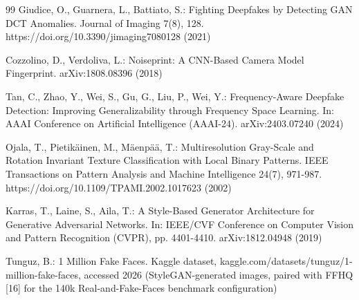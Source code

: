\documentclass[11pt]{article}
\begin{document}
\begin{thebibliography}{99}
 Giudice, O., Guarnera, L., Battiato, S.: Fighting Deepfakes by Detecting GAN DCT Anomalies. Journal of Imaging 7(8), 128. https://doi.org/10.3390/jimaging7080128 (2021)

 Cozzolino, D., Verdoliva, L.: Noiseprint: A CNN-Based Camera Model Fingerprint. arXiv:1808.08396 (2018)

 Tan, C., Zhao, Y., Wei, S., Gu, G., Liu, P., Wei, Y.: Frequency-Aware Deepfake Detection: Improving Generalizability through Frequency Space Learning. In: AAAI Conference on Artificial Intelligence (AAAI-24). arXiv:2403.07240 (2024)

 Ojala, T., Pietik\"ainen, M., M\"aenp\"a\"a, T.: Multiresolution Gray-Scale and Rotation Invariant Texture Classification with Local Binary Patterns. IEEE Transactions on Pattern Analysis and Machine Intelligence 24(7), 971-987. https://doi.org/10.1109/TPAMI.2002.1017623 (2002)

 Karras, T., Laine, S., Aila, T.: A Style-Based Generator Architecture for Generative Adversarial Networks. In: IEEE/CVF Conference on Computer Vision and Pattern Recognition (CVPR), pp. 4401-4410. arXiv:1812.04948 (2019)

 Tunguz, B.: 1 Million Fake Faces. Kaggle dataset, kaggle.com/datasets/tunguz/1-million-fake-faces, accessed 2026 (StyleGAN-generated images, paired with FFHQ [16] for the 140k Real-and-Fake-Faces benchmark configuration)

\end{thebibliography}
\end{document}
